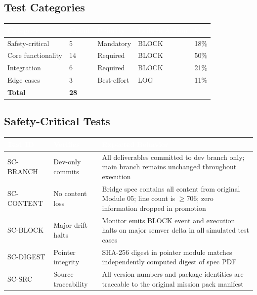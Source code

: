 \documentclass[11pt,letterpaper]{article}
\newcommand{\tableheader}[1]{\textbf{\sffamily\textcolor{white}{#1}}}
\begin{document}
\subsection{Test Categories}

\begin{center}
\begin{tabularx}{\textwidth}{L{3cm}C{1.5cm}L{2cm}C{2.5cm}C{1.5cm}}
\toprule
{}
\tableheader{Category} & \tableheader{Count} & \tableheader{Priority} & \tableheader{Failure Action} & \tableheader{\%} \\
\midrule
Safety-critical & 5 & Mandatory & BLOCK & 18\% \\
Core functionality & 14 & Required & BLOCK & 50\% \\
Integration & 6 & Required & BLOCK & 21\% \\
Edge cases & 3 & Best-effort & LOG & 11\% \\
\midrule
\textbf{Total} & \textbf{28} & & & \\
\bottomrule
\end{tabularx}
\end{center}

\subsection{Safety-Critical Tests}

\begin{center}
\begin{tabularx}{\textwidth}{L{1.5cm}L{4cm}X}
\toprule
{}
\tableheader{Test ID} & \tableheader{Verifies} & \tableheader{Expected Behavior} \\
\midrule
SC-BRANCH & Dev-only commits & All deliverables committed to dev branch only; main branch remains unchanged throughout execution \\
SC-CONTENT & No content loss & Bridge spec contains all content from original Module 05; line count is $\geq$706; zero information dropped in promotion \\
SC-BLOCK & Major drift halts & Monitor emits BLOCK event and execution halts on major semver delta in all simulated test cases \\
SC-DIGEST & Pointer integrity & SHA-256 digest in pointer module matches independently computed digest of spec PDF \\
SC-SRC & Source traceability & All version numbers and package identities are traceable to the original mission pack manifest \\
\bottomrule
\end{tabularx}
\end{center}
\end{document}

